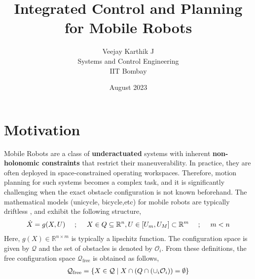 \documentclass{article}
\begin{document}
\title{Integrated Control and Planning for Mobile Robots}
\author{Veejay Karthik J\\
Systems and Control Engineering\\
IIT Bombay}
\date{August 2023}


\maketitle

\section{Motivation}

Mobile Robots are a class of \textbf{underactuated} systems with inherent \textbf{non-holonomic constraints} that restrict their maneuverability. In practice, they are often deployed in space-constrained operating workspaces. Therefore, motion planning for such systems becomes a complex task, and it is significantly challenging when the exact obstacle configuration is not known beforehand. The mathematical models (unicycle, bicycle,etc) for mobile robots are typically driftless , and exhibit the following structure,
\begin{align}
\label{eqn:SystemDescription}
\centering
\dot{X} = g(X,U) \quad~;~\quad X \in Q \subseteq \mathbb{R}^n, U\in [U_m,U_M]\subset\mathbb{R}^m \quad~;~\quad m < n
\end{align}
Here, $g(X)\in \mathbb{R}^{n\times m}$ is typically a lipschitz function. The configuration space is given by $\mathcal{Q}$ and the set of obstacles is denoted by $\mathcal{O}_i$. From these definitions, the free configuration space $\mathcal{Q}_{\text{free}}$ is obtained as follows,
\begin{align}
    \label{eqn:FreeWorkspaces}
    \centering
    \mathcal{Q}_{\text{free}} = \{X\in\mathcal{Q}\;|\; X\cap\left(Q\cap (\cup_i \mathcal{O}_i)\right) = \emptyset \}
\end{align}
\end{document}
